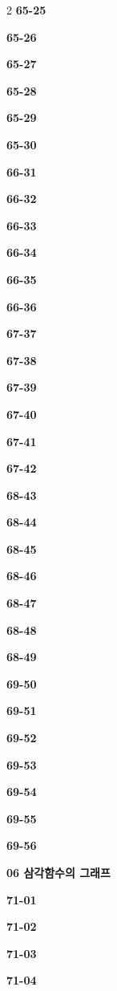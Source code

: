 \documentclass[10pt,a4paper]{article}
\begin{document}
\begin{multicols}{2}
\noindent\textbf{65-25}\ \par
\noindent\textbf{65-26}\ \par
\noindent\textbf{65-27}\ \par
\noindent\textbf{65-28}\ \par
\noindent\textbf{65-29}\ \par
\noindent\textbf{65-30}\ \par
\noindent\textbf{66-31}\ \par
\noindent\textbf{66-32}\ \par
\noindent\textbf{66-33}\ \par
\noindent\textbf{66-34}\ \par
\noindent\textbf{66-35}\ \par
\noindent\textbf{66-36}\ \par
\noindent\textbf{67-37}\ \par
\noindent\textbf{67-38}\ \par
\noindent\textbf{67-39}\ \par
\noindent\textbf{67-40}\ \par
\noindent\textbf{67-41}\ \par
\noindent\textbf{67-42}\ \par
\noindent\textbf{68-43}\ \par
\noindent\textbf{68-44}\ \par
\noindent\textbf{68-45}\ \par
\noindent\textbf{68-46}\ \par
\noindent\textbf{68-47}\ \par
\noindent\textbf{68-48}\ \par
\noindent\textbf{68-49}\ \par
\noindent\textbf{69-50}\ \par
\noindent\textbf{69-51}\ \par
\noindent\textbf{69-52}\ \par
\noindent\textbf{69-53}\ \par
\noindent\textbf{69-54}\ \par
\noindent\textbf{69-55}\ \par
\noindent\textbf{69-56}\ \par
\noindent\textbf{06 삼각함수의 그래프}\par\smallskip
\noindent\textbf{71-01}\ \par
\noindent\textbf{71-02}\ \par
\noindent\textbf{71-03}\ \par
\noindent\textbf{71-04}\ \par

\end{multicols}
\end{document}
